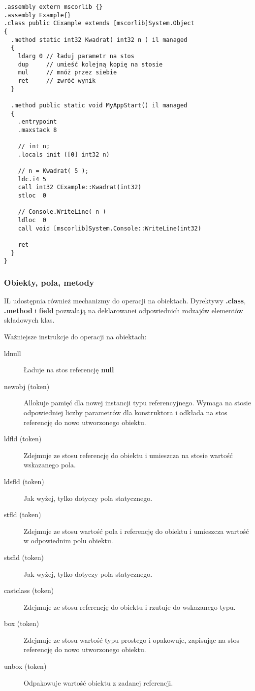 \begin{scriptsize}
\begin{verbatim}
.assembly extern mscorlib {}
.assembly Example{} 
.class public CExample extends [mscorlib]System.Object
{ 
  .method static int32 Kwadrat( int32 n ) il managed
  {
    ldarg 0 // ładuj parametr na stos
    dup     // umieść kolejną kopię na stosie 
    mul     // mnóż przez siebie
    ret     // zwróć wynik 
  }

  .method public static void MyAppStart() il managed 
  { 
    .entrypoint 
    .maxstack 8

    // int n;
    .locals init ([0] int32 n)

    // n = Kwadrat( 5 );
    ldc.i4 5
    call int32 CExample::Kwadrat(int32)
    stloc  0

    // Console.WriteLine( n )
    ldloc  0
    call void [mscorlib]System.Console::WriteLine(int32)
    
    ret 
  } 
}
\end{verbatim}
\end{scriptsize}

\subsubsection{Obiekty, pola, metody}

IL udostępnia również mechanizmy do operacji na obiektach. Dyrektywy {\bf .class}, {\bf .method} 
i {\bf field} pozwalają na deklarowanei odpowiednich rodzajów elementów składowych klas. 

Ważniejsze instrukcje do operacji na obiektach:
\begin{description}
\item [ldnull] Ładuje na stos referencję {\bf null}
\item [newobj (token)] Allokuje pamięć dla nowej instancji typu referencyjnego. Wymaga na stosie odpowiedniej liczby parametrów dla konstruktora i odkłada na stos referencję do nowo utworzonego obiektu.
\item [ldfld (token)] Zdejmuje ze stosu referencję do obiektu i umieszcza na stosie wartość wskazanego pola.
\item [ldsfld (token)] Jak wyżej, tylko dotyczy pola statycznego.
\item [stfld (token)] Zdejmuje ze stosu wartość pola i referencję do obiektu i umieszcza wartość w odpowiednim polu obiektu.
\item [stsfld (token)] Jak wyżej, tylko dotyczy pola statycznego.
\item [castclass (token)] Zdejmuje ze stosu referencję do obiektu i rzutuje do wskazanego typu.
\item [box (token)] Zdejmuje ze stosu wartość typu prostego i opakowuje, zapisując na stos referencję do nowo utworzonego obiektu.
\item [unbox (token)] Odpakowuje wartość obiektu z zadanej referencji. 
\end{description}

